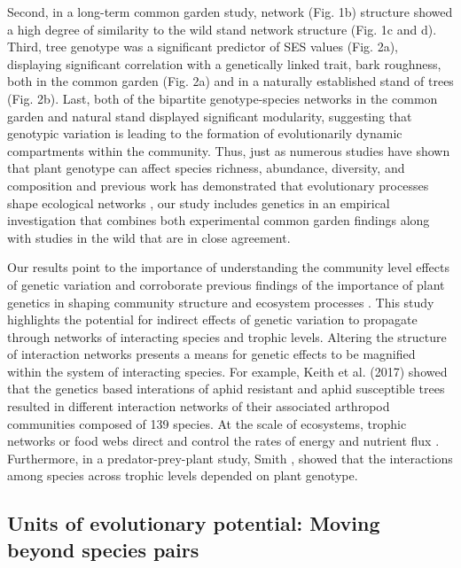 \documentclass[9pt,twocolumn,twoside,lineno]{pnas-new}
\begin{document}
Second, in a long-term common garden study, network
(Fig. 1b) structure showed a high degree of similarity to the wild
stand network structure (Fig. 1c and d). Third, tree genotype was a
significant predictor of SES values (Fig. 2a), displaying significant
correlation with a genetically linked trait, bark roughness, both in
the common garden (Fig. 2a) and in a naturally established stand of
trees (Fig. 2b). Last, both of the bipartite genotype-species networks
in the common garden and natural stand displayed significant
modularity, suggesting that genotypic variation is leading to the
formation of evolutionarily dynamic compartments within the
community. Thus, just as numerous studies have shown that plant
genotype can affect species richness, abundance, diversity, and
composition and previous work has demonstrated that evolutionary
processes shape ecological networks \cite{Guimaraes2011,
  Moya-Larano2011}, our study includes genetics in an empirical
investigation that combines both experimental common garden findings
along with studies in the wild that are in close agreement.

Our results point to the importance of understanding the community
level effects of genetic variation and corroborate previous findings
of the importance of plant genetics in shaping community structure and
ecosystem processes \cite{Whitham2006a}.  This study highlights the
potential for indirect effects of genetic variation to propagate
through networks of interacting species and trophic levels. Altering
the structure of interaction networks presents a means for genetic
effects to be magnified within the system of interacting species. For
example, Keith et al. (2017) showed that the genetics based
interations of aphid resistant and aphid susceptible trees resulted in
different interaction networks of their associated arthropod
communities composed of 139 species. At the scale of ecosystems,
trophic networks or food webs direct and control the rates of energy
and nutrient flux \cite{Borgatti2006}. Furthermore, in a
predator-prey-plant study, Smith \cite{Smith2011}, showed that the
interactions among species across trophic levels depended on plant
genotype.

\subsection{Units of evolutionary potential: Moving beyond species pairs}
\end{document}
